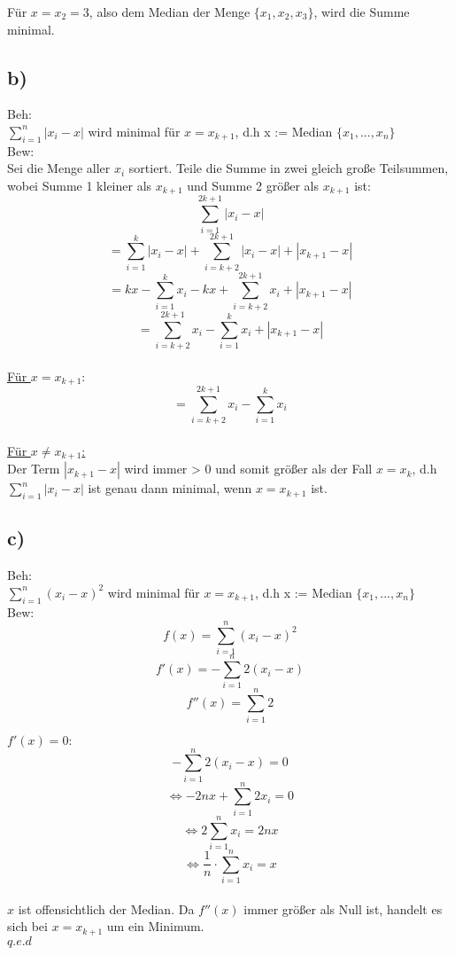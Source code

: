 \documentclass[a4paper,11pt,twoside]{article}
\begin{document}
Für $x=x_2=3$, also dem Median der Menge $\{x_1, x_2, x_3\}$, wird die Summe minimal.

\pagebreak

\subsection*{b)}

Beh:\\ $\sum_{i=1}^{n} |x_i-x|$ wird minimal für $x = x_{k+1}$, d.h x := Median $\{x_1, ..., x_n\}$\\

Bew: \\
Sei die Menge aller $x_i$ sortiert. Teile die Summe in zwei gleich große Teilsummen, wobei Summe 1 kleiner als $x_{k+1}$ und Summe 2 größer als $x_{k+1} $ ist:
\[\sum_{i=1}^{2k+1}|x_i-x|\]
\[= \sum_{i=1}^{k}|x_i-x| + \sum_{i=k+2}^{2k+1}|x_i-x| + |x_{k+1}-x|\]
\[= kx - \sum_{i=1}^{k}x_i -kx+ \sum_{i=k+2}^{2k+1}x_i + |x_{k+1}-x|\]
\[= \sum_{i=k+2}^{2k+1}x_i - \sum_{i=1}^{k}x_i + |x_{k+1}-x|\]\\

\underline{Für $x=x_{k+1}$}:
\[= \sum_{i=k+2}^{2k+1}x_i - \sum_{i=1}^{k}x_i \] \\

\underline{Für $x \neq x_{k+1}$:}\\
Der Term  $|x_{k+1}-x|$ wird immer > 0 und somit größer als der Fall $x=x_k$, d.h  $\sum_{i=1}^{n} |x_i-x|$ ist genau dann minimal, wenn $x = x_{k+1}$ ist.

\subsection*{c)}

Beh:\\ $\sum_{i=1}^{n} (x_i-x)^2$ wird minimal für $x = x_{k+1}$, d.h x := Median $\{x_1, ..., x_n\}$\\

Bew: \\
\[f(x) = \sum_{i=1}^{n} (x_i -x)^2\]
\[f'(x) = -\sum_{i=1}^{n} 2(x_i -x)\]
\[f''(x) = \sum_{i=1}^{n} 2\]

\underline{$f'(x)=0:$}\\
\[-\sum_{i=1}^{n}2(x_i -x) = 0\]
\[\Leftrightarrow -2nx + \sum_{i=1}^{n}2x_i = 0\]
\[\Leftrightarrow 2\sum_{i=1}^{n}x_i = 2nx\]
\[\Leftrightarrow \frac{1}{n} \cdot \sum_{i=1}^{n}x_i = x\]\\

$x$ ist offensichtlich der Median. Da $f''(x)$ immer größer als Null ist, handelt es sich bei $x=x_{k+1}$ um ein Minimum.\\
$q.e.d$
\end{document}

